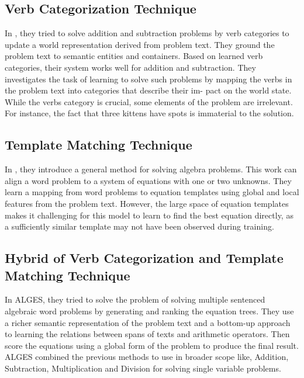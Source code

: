 \documentclass[document.tex]{subfiles}
\begin{document}
\subsection{Verb Categorization Technique}
\noindent In \cite{1}, they tried to solve addition and subtraction problems by verb categories to update a world representation derived from problem text. They ground the problem text to semantic entities and containers. Based on learned verb categories, their system works well for addition and subtraction.
They investigates the task of learning to
solve such problems by mapping the verbs in the
problem text into categories that describe their im-
pact on the world state. While the verbs category
is crucial, some elements of the
problem are irrelevant. For instance, the fact that
three kittens have spots is immaterial to the solution. 
\subsection{Template Matching Technique}
\noindent In \cite{2}, they introduce a general method for solving algebra problems. This work can align a word problem to a system of equations with one or two unknowns. They learn a mapping from word problems to equation templates using global and local features from the problem text. However, the
large space of equation templates makes it challenging for this model to learn to find the best equation
directly, as a sufficiently similar template may not
have been observed during training.
\subsection{Hybrid of Verb Categorization and Template Matching Technique}
\noindent In ALGES\cite{3}, they tried to solve the problem of solving multiple sentenced algebraic word problems by generating and ranking the equation trees. They use a richer semantic representation of the problem text and a bottom-up approach to learning the relations between spans of texts and arithmetic operators. Then score the equations using a global form of the problem to produce the final result. ALGES combined the previous methods to use in broader scope like, Addition, Subtraction, Multiplication and Division for solving single variable problems.
\end{document}
